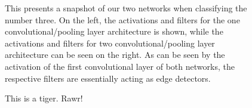 \documentclass[10pt,twocolumn,letterpaper]{article}
\begin{document}
\begin{figure}
  \caption{This presents a snapshot of our two networks when classifying the number three. On the left, the activations and filters for the one convolutional/pooling layer
  architecture is shown, while the activations and filters for two convolutional/pooling layer architecture can be seen on the right. As can be seen by the activation of the 
  first convolutional layer of both networks, the respective filters are essentially acting as edge detectors.}
  \label{fig:actfilts}
\end{figure}

\begin{figure}
  \caption{This is a tiger. Rawr!}
  \label{fig:misclassify}
\end{figure}

{\small


}
\end{document}
